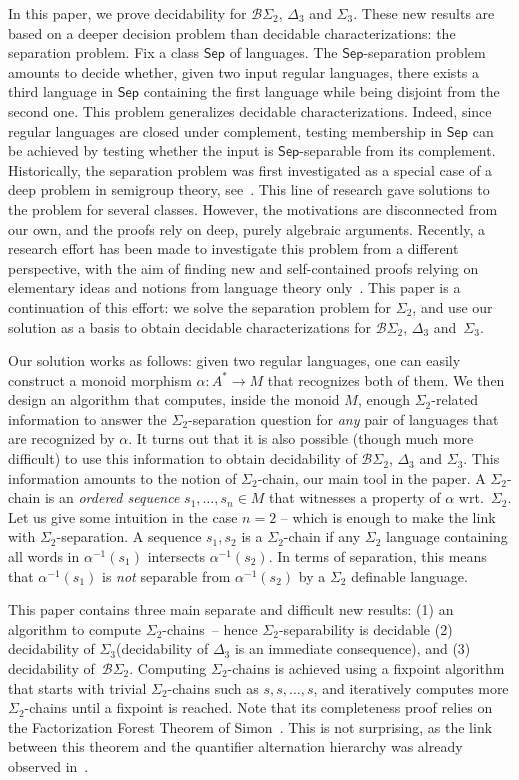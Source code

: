 \documentclass[envcountsame]{llncs}
\newcommand{\sic}[1]{\ensuremath{\Sigma_{#1}}\xspace}
\newcommand{\sicd}{\ensuremath{\Sigma_{2}}\xspace}
\newcommand{\bscd}{\ensuremath{\mathcal{B}\Sigma_{2}}\xspace}
\newcommand{\dect}{\ensuremath{\Delta_{3}}\xspace}
\newcommand{\sict}{\ensuremath{\Sigma_{3}}\xspace}
\newcommand\Sep{\ensuremath{\mathsf{Sep}}\xspace}
\newcommand\qchain[1]{\ensuremath{\sic{#1}}-chain\xspace}
\newcommand\qchains[1]{\ensuremath{\sic{#1}}-chains\xspace}
\newcommand\dchain{\qchain{2}}
\newcommand\dchains{\qchains{2}}
\begin{document}
In this paper, we prove decidability for \bscd, \dect and \sict. These new
results are based on a deeper decision problem than decidable
characterizations: the separation problem. Fix a class \Sep of languages. The
\Sep-separation problem amounts to decide whether, given two input regular
languages, there exists a third language in \Sep containing the first language
while being disjoint from the second one. This problem generalizes
decidable characterizations. Indeed, since regular languages are closed under
complement, testing membership in \Sep can be achieved by testing whether the
input is \Sep-separable from its complement. Historically, the separation problem
was first investigated as a special case of a deep problem in semigroup
theory, see~\cite{MR1709911}. This line of research gave solutions to the
problem for several classes. However, the motivations are disconnected from our own, and the proofs rely on
deep, purely algebraic arguments. Recently, a research effort has been made to
investigate this problem from a different perspective, with the aim of finding
new and self-contained proofs relying on elementary ideas and notions from
language theory only~\cite{martens,pvzmfcs13,pzfo,pvzltt}. This paper is a
continuation of this effort: we solve the separation problem for \sicd, and
use our solution as a basis to obtain decidable characterizations for \bscd,
\dect and~\sict.

Our solution works as follows: given two regular languages, one can
easily construct a monoid morphism $\alpha: A^* \rightarrow M$ that
recognizes both of them. We then design an algorithm that computes, inside the
monoid $M$,
enough \sicd-related information to answer the \sicd-separation
question for \emph{any} pair of languages that are recognized by
$\alpha$. It turns out that it is also possible (though much more
difficult) to use this information to obtain decidability of \bscd,
\dect and \sict. This information amounts to the notion of \dchain,
our main tool in the paper. A \dchain is an \emph{ordered
  sequence} $s_1,\dots,s_n \in M$ that witnesses a property of
$\alpha$ wrt.\ \sicd. Let us give some intuition in the case $n = 2$ -- which is enough to make the
link with \sicd-separation. A sequence $s_1,s_2$ is a \dchain if
any \sicd language containing all words in $\alpha^{-1}(s_1)$ 
intersects $\alpha^{-1}(s_2)$. In terms of separation, this means that
$\alpha^{-1}(s_1)$ is \emph{not} separable from $\alpha^{-1}(s_2)$ by a
$\sicd$ definable language.

This paper contains three main separate and difficult new results:
(1) an algorithm to compute \dchains\ -- hence \sicd-separability is decidable (2)
decidability of \sict (decidability of \dect is an immediate
consequence), and (3) decidability of~\bscd. Computing \dchains is
achieved using a fixpoint algorithm that starts with trivial \dchains
such as $s,s,\dots,s$, and iteratively computes more \dchains until a
fixpoint is reached. Note that its completeness proof relies on
the Factorization Forest Theorem of Simon~\cite{simonfacto}. This is
not surprising, as the link between this theorem and the quantifier
alternation hierarchy was already observed in~\cite{pwdelta,bfacto}.
\end{document}
